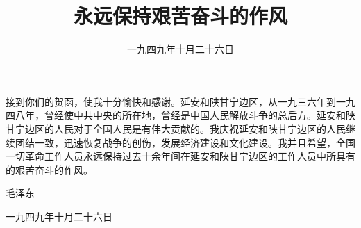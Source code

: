 
\title{永远保持艰苦奋斗的作风}
\date{一九四九年十月二十六日}
\maketitle



接到你们的贺函，使我十分愉快和感谢。延安和陕甘宁边区，从一九三六年到一九四八年，曾经使中共中央的所在地，曾经是中国人民解放斗争的总后方。延安和陕甘宁边区的人民对于全国人民是有伟大贡献的。我庆祝延安和陕甘宁边区的人民继续团结一致，迅速恢复战争的创伤，发展经济建设和文化建设。我并且希望，全国一切革命工作人员永远保持过去十余年间在延安和陕甘宁边区的工作人员中所具有的艰苦奋斗的作风。

毛泽东

一九四九年十月二十六日
